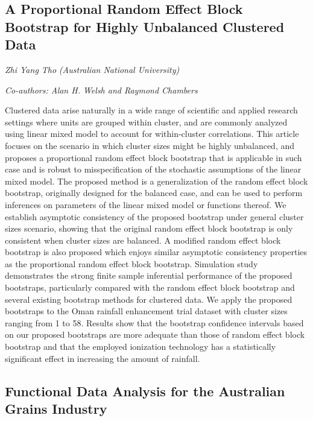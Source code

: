 \documentclass[
]{scrreprt}
\begin{document}
\subsection{A Proportional Random Effect Block Bootstrap for Highly
Unbalanced Clustered
Data}\label{a-proportional-random-effect-block-bootstrap-for-highly-unbalanced-clustered-data}

\emph{Zhi Yang Tho} \emph{(Australian National
University)}

\emph{Co-authors: Alan H. Welsh and Raymond Chambers}

\setlength{\parskip}{0.5em}

Clustered data arise naturally in a wide range of scientific and applied
research settings where units are grouped within cluster, and are
commonly analyzed using linear mixed model to account for within-cluster
correlations. This article focuses on the scenario in which cluster
sizes might be highly unbalanced, and proposes a proportional random
effect block bootstrap that is applicable in such case and is robust to
misspecification of the stochastic assumptions of the linear mixed
model. The proposed method is a generalization of the random effect
block bootstrap, originally designed for the balanced case, and can be
used to perform inferences on parameters of the linear mixed model or
functions thereof. We establish asymptotic consistency of the proposed
bootstrap under general cluster sizes scenario, showing that the
original random effect block bootstrap is only consistent when cluster
sizes are balanced. A modified random effect block bootstrap is also
proposed which enjoys similar asymptotic consistency properties as the
proportional random effect block bootstrap. Simulation study
demonstrates the strong finite sample inferential performance of the
proposed bootstraps, particularly compared with the random effect block
bootstrap and several existing bootstrap methods for clustered data. We
apply the proposed bootstraps to the Oman rainfall enhancement trial
dataset with cluster sizes ranging from 1 to 58. Results show that the
bootstrap confidence intervals based on our proposed bootstraps are more
adequate than those of random effect block bootstrap and that the
employed ionization technology has a statistically significant effect in
increasing the amount of rainfall.

\subsection{Functional Data Analysis for the Australian Grains
Industry}\label{functional-data-analysis-for-the-australian-grains-industry}
\end{document}
